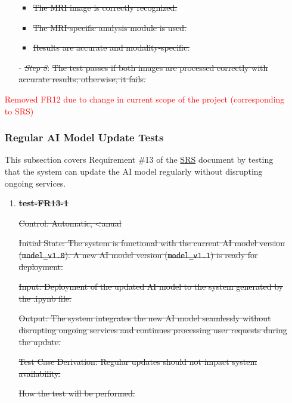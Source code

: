 \documentclass[12pt, titlepage]{article}
\begin{document}
\begin{enumerate}
\begin{itemize}
    \begin{itemize}
      \item \sout{The MRI image is correctly recognized.}
      \item \sout{The MRI-specific analysis module is used.}
      \item \sout{Results are accurate and modality-specific.}
    \end{itemize}
  \item[-] \textit{\sout{Step 8}}: \sout{The test passes if both images are processed correctly with accurate results; otherwise, it fails.}
\end{itemize}

\textcolor{red}{Removed FR12 due to change in current scope of the project (corresponding to SRS)}

\subsubsection{Regular AI Model Update Tests}

This subsection covers Requirement \#13 of the \href{https://github.com/RezaJodeiri/CXR-Capstone/blob/main/docs/SRS/SRS.pdf}{SRS} \citep{SRS}
document by testing that the system can update the AI model regularly without disrupting ongoing services.

\begin{enumerate}

\item \textbf{\sout{test-FR13-1}} \label{test-FR13-1}

\sout{Control: Automatic, <anual}

\sout{Initial State: The system is functional with the current AI model version (\texttt{model\_v1.0}). A new AI model version (\texttt{model\_v1.1}) is ready for deployment.}

\sout{Input: Deployment of the updated AI model to the system generated by the .ipynb file.}

\sout{Output: The system integrates the new AI model seamlessly without disrupting ongoing services and continues processing user requests during the update.}

\sout{Test Case Derivation: Regular updates should not impact system availability.}

\sout{How the test will be performed:}


\end{enumerate}
\end{enumerate}
\end{document}
